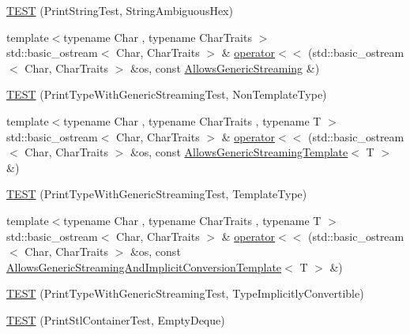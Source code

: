 \begin{DoxyCompactItemize}
\item 
\mbox{\hyperlink{namespacetesting_1_1gtest__printers__test_ac20ee165500471e363011c3f664d2fb8}{T\+E\+ST}} (Print\+String\+Test, String\+Ambiguous\+Hex)
\item 
{\footnotesize template$<$typename Char , typename Char\+Traits $>$ }\\std\+::basic\+\_\+ostream$<$ Char, Char\+Traits $>$ \& \mbox{\hyperlink{namespacetesting_1_1gtest__printers__test_a1eb0213095e639d357692066e8505887}{operator$<$$<$}} (std\+::basic\+\_\+ostream$<$ Char, Char\+Traits $>$ \&os, const \mbox{\hyperlink{classtesting_1_1gtest__printers__test_1_1AllowsGenericStreaming}{Allows\+Generic\+Streaming}} \&)
\item 
\mbox{\hyperlink{namespacetesting_1_1gtest__printers__test_a9272037c799c4779e1d79476dad66cb6}{T\+E\+ST}} (Print\+Type\+With\+Generic\+Streaming\+Test, Non\+Template\+Type)
\item 
{\footnotesize template$<$typename Char , typename Char\+Traits , typename T $>$ }\\std\+::basic\+\_\+ostream$<$ Char, Char\+Traits $>$ \& \mbox{\hyperlink{namespacetesting_1_1gtest__printers__test_a5464168e925b1adf29986c8e544e908e}{operator$<$$<$}} (std\+::basic\+\_\+ostream$<$ Char, Char\+Traits $>$ \&os, const \mbox{\hyperlink{classtesting_1_1gtest__printers__test_1_1AllowsGenericStreamingTemplate}{Allows\+Generic\+Streaming\+Template}}$<$ T $>$ \&)
\item 
\mbox{\hyperlink{namespacetesting_1_1gtest__printers__test_a6e180c85f307712a995985f7bc735fd1}{T\+E\+ST}} (Print\+Type\+With\+Generic\+Streaming\+Test, Template\+Type)
\item 
{\footnotesize template$<$typename Char , typename Char\+Traits , typename T $>$ }\\std\+::basic\+\_\+ostream$<$ Char, Char\+Traits $>$ \& \mbox{\hyperlink{namespacetesting_1_1gtest__printers__test_a09eedfbca613302efe6438d2a537f419}{operator$<$$<$}} (std\+::basic\+\_\+ostream$<$ Char, Char\+Traits $>$ \&os, const \mbox{\hyperlink{classtesting_1_1gtest__printers__test_1_1AllowsGenericStreamingAndImplicitConversionTemplate}{Allows\+Generic\+Streaming\+And\+Implicit\+Conversion\+Template}}$<$ T $>$ \&)
\item 
\mbox{\hyperlink{namespacetesting_1_1gtest__printers__test_a68877c5e1ec7a53281798310c30e1776}{T\+E\+ST}} (Print\+Type\+With\+Generic\+Streaming\+Test, Type\+Implicitly\+Convertible)
\item 
\mbox{\hyperlink{namespacetesting_1_1gtest__printers__test_a1ce10b8a3634e0f6bfbfbb5888c04a95}{T\+E\+ST}} (Print\+Stl\+Container\+Test, Empty\+Deque)

\end{DoxyCompactItemize}

